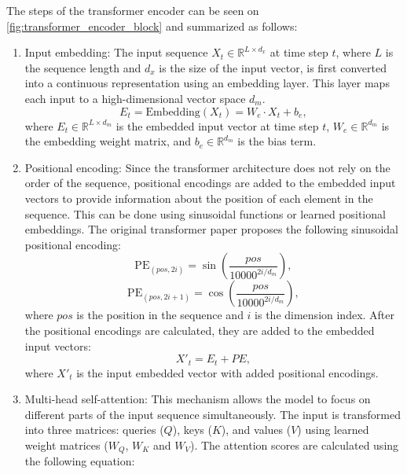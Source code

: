 The steps of the transformer encoder can be seen on \ref{fig:transformer_encoder_block} and summarized as follows:
\begin{enumerate}
    \item Input embedding: The input sequence $X_t \in \mathbb{R}^{L \times d_x}$ at time step $t$, where $L$ is the sequence length and $d_x$ is the size of the input vector, is first converted into a continuous representation using an embedding layer. This layer maps each input to a high-dimensional vector space $d_m$. 
    \begin{equation}
        E_t = \text{Embedding}(X_t) = W_e \cdot X_t + b_e,
    \end{equation}
    where $E_t\in \mathbb{R}^{L \times d_m}$ is the embedded input vector at time step $t$, $W_e \in \mathbb{R}^{d_m}$ is the embedding weight matrix, and $b_e \in \mathbb{R}^{d_m}$ is the bias term. 
    \item Positional encoding: Since the transformer architecture does not rely on the order of the sequence, positional encodings are added to the embedded input vectors to provide information about the position of each element in the sequence. This can be done using sinusoidal functions or learned positional embeddings. The original transformer paper \cite{transformer_google} proposes the following sinusoidal positional encoding:
    \begin{equation}
        \text{PE}_{(pos, 2i)} = \sin\left(\frac{pos}{10000^{2i/d_m}}\right),
    \end{equation}
    \begin{equation}
        \text{PE}_{(pos, 2i+1)} = \cos\left(\frac{pos}{10000^{2i/d_m}}\right),
    \end{equation}
    where $pos$ is the position in the sequence and $i$ is the dimension index. After the positional encodings are calculated, they are added to the embedded input vectors:
    \begin{equation}
        X'_t = E_t + PE,
    \end{equation}
    where $X'_t$ is the input embedded vector with added positional encodings.
    \item Multi-head self-attention: This mechanism allows the model to focus on different parts of the input sequence simultaneously. The input is transformed into three matrices: queries ($Q$), keys ($K$), and values ($V$) using learned weight matrices ($W_Q$, $W_K$ and $W_V$). The attention scores are calculated using the following equation:
    \begin{equation}

\end{equation}
\end{enumerate}
